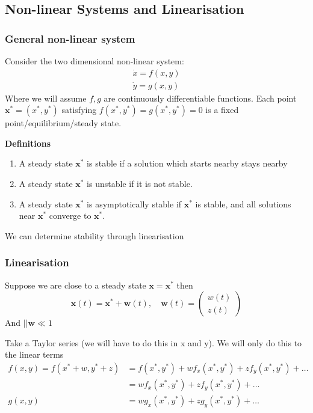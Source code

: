 \documentclass{X:/Documents/Coding/Latex/myassignment}
\begin{document}
\subsection{Non-linear Systems and Linearisation}
\subsubsection{General non-linear system}
Consider the two dimensional non-linear system:
\begin{align*}
    \dot x = f(x,y)\\
    \dot y = g(x,y)
\end{align*}
Where we will assume  $f,g$ are continuously differentiable functions.
Each point $\mathbf{x}^* = (x^*,y^*)$ satisfying $f(x^*,y^*) = g(x^*,y^*) = 0$ is a fixed point/equilibrium/steady state.

\textbf{Definitions}
\begin{enumerate}
\item A steady state $\mathbf{x}^*$ is stable if a solution which starts nearby stays nearby
\item A steady state $\mathbf{x}^*$ is unstable if it is not stable.
\item A steady state $\mathbf{x}^*$ is asymptotically stable if $\mathbf{x}^*$ is stable, and all solutions near $\mathbf{x}^*$ converge to $\mathbf{x}^*$.
\end{enumerate} 
We can determine stability through linearisation

\subsubsection{Linearisation}
Suppose we are close to a steady state $\mathbf{x} = \mathbf{x^*}$ then
\[\mathbf{x}(t) = \mathbf{x^*} + \mathbf{w}(t), \quad \mathbf{w}(t) = \begin{pmatrix}
w(t)\\z(t)
\end{pmatrix}\]
And $||\mathbf{w}\ll 1$


Take a Taylor series (we will have to do this in x and y). We will only do this to the linear terms
\begin{align*}
    f(x,y) = f(x^*+w,y^*+z) &= f(x^*,y^*) + w f_x(x^*,y^*) + zf_y(x^*,y^*) + \ldots\\
    &= w f_x(x^*,y^*) + zf_y(x^*,y^*) + \ldots\\
    g(x,y) &= wg_x(x^*,y^*) + zg_y(x^*,y^*) + \ldots
\end{align*}
\end{document}
